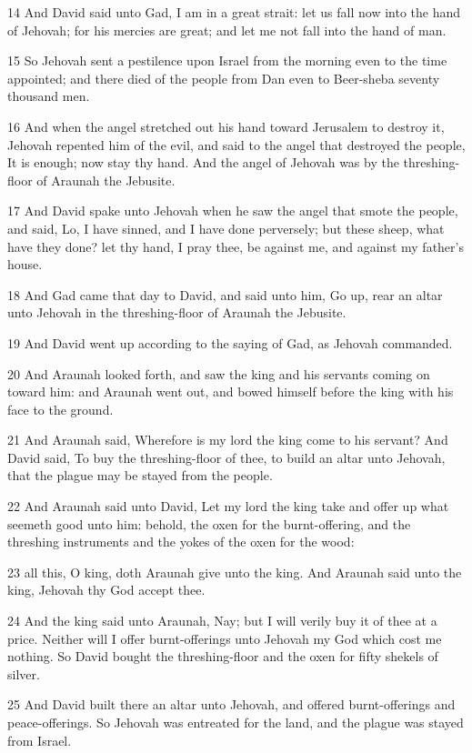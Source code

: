\par 14 And David said unto Gad, I am in a great strait: let us fall now into the hand of Jehovah; for his mercies are great; and let me not fall into the hand of man.
\par 15 So Jehovah sent a pestilence upon Israel from the morning even to the time appointed; and there died of the people from Dan even to Beer-sheba seventy thousand men.
\par 16 And when the angel stretched out his hand toward Jerusalem to destroy it, Jehovah repented him of the evil, and said to the angel that destroyed the people, It is enough; now stay thy hand. And the angel of Jehovah was by the threshing-floor of Araunah the Jebusite.
\par 17 And David spake unto Jehovah when he saw the angel that smote the people, and said, Lo, I have sinned, and I have done perversely; but these sheep, what have they done? let thy hand, I pray thee, be against me, and against my father's house.
\par 18 And Gad came that day to David, and said unto him, Go up, rear an altar unto Jehovah in the threshing-floor of Araunah the Jebusite.
\par 19 And David went up according to the saying of Gad, as Jehovah commanded.
\par 20 And Araunah looked forth, and saw the king and his servants coming on toward him: and Araunah went out, and bowed himself before the king with his face to the ground.
\par 21 And Araunah said, Wherefore is my lord the king come to his servant? And David said, To buy the threshing-floor of thee, to build an altar unto Jehovah, that the plague may be stayed from the people.
\par 22 And Araunah said unto David, Let my lord the king take and offer up what seemeth good unto him: behold, the oxen for the burnt-offering, and the threshing instruments and the yokes of the oxen for the wood:
\par 23 all this, O king, doth Araunah give unto the king. And Araunah said unto the king, Jehovah thy God accept thee.
\par 24 And the king said unto Araunah, Nay; but I will verily buy it of thee at a price. Neither will I offer burnt-offerings unto Jehovah my God which cost me nothing. So David bought the threshing-floor and the oxen for fifty shekels of silver.
\par 25 And David built there an altar unto Jehovah, and offered burnt-offerings and peace-offerings. So Jehovah was entreated for the land, and the plague was stayed from Israel.


